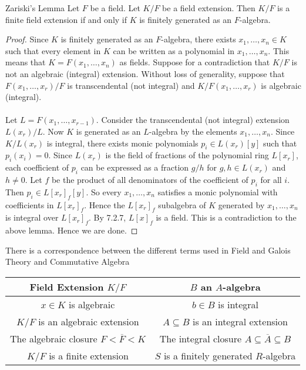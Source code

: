 \documentclass[a4paper]{article}
\begin{document}
\begin{thm}{Zariski's Lemma}{} Let $F$ be a field. Let $K/F$ be a field extension. Then $K/F$ is a finite field extension if and only if $K$ is finitely generated as an $F$-algebra. \tcbline
\begin{proof}
Since $K$ is finitely generated as an $F$-algebra, there exists $x_1,\dots,x_n\in K$ such that every element in $K$ can be written as a polynomial in $x_1,\dots,x_n$. This means that $K=F(x_1,\dots,x_n)$ as fields. Suppose for a contradiction that $K/F$ is not an algebraic (integral) extension. Without loss of generality, suppose that $F(x_1,\dots,x_r)/F$ is transcendental (not integral) and $K/F(x_1,\dots,x_r)$ is algebraic (integral). \\~\\

Let $L=F(x_1,\dots,x_{r-1})$. Consider the transcendental (not integral) extension $L(x_r)/L$. Now $K$ is generated as an $L$-algebra by the elements $x_1,\dots,x_n$. Since $K/L(x_r)$ is integral, there exists monic polynomials $p_i\in L(x_r)[y]$ such that $p_i(x_i)=0$. Since $L(x_r)$ is the field of fractions of the polynomial ring $L[x_r]$, each coefficient of $p_i$ can be expressed as a fraction $g/h$ for $g,h\in L(x_r)$ and $h\neq 0$. Let $f$ be the product of all denominators of the coefficient of $p_i$ for all $i$. Then $p_i\in L[x_r]_f[y]$. So every $x_1,\dots,x_n$ satisfies a monic polynomial with coefficients in $L[x_r]_f$. Hence the $L[x_r]_f$ subalgebra of $K$ generated by $x_1,\dots,x_n$ is integral over $L[x_r]_f$. By 7.2.7, $L[x]_f$ is a field. This is a contradiction to the above lemma. Hence we are done. 
\end{proof}
\end{thm}

There is a correspondence between the different terms used in Field and Galois Theory and Commutative Algebra

\begin{table}[!h]
\centering
\begin{tabular}{c|c}
Field Extension $K/F$  & $B$ an $A$-algebra \\ \hline
$x\in K$ is algebraic     & $b\in B$ is integral            \\
$K/F$ is an algebraic extension    & $A\subseteq B$ is an integral extension       \\
The algebraic closure $F<\overline{F}<K$     & The integral closure $A\subseteq\overline{A}\subseteq B$          \\
$K/F$ is a finite extension & $S$ is a finitely generated $R$-algebra
\end{tabular}
\end{table}
\end{document}
